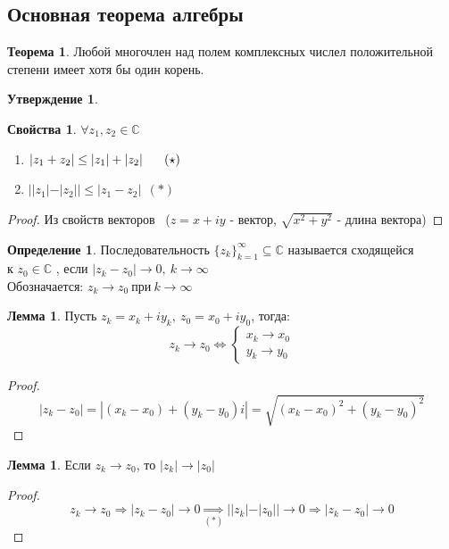 \documentclass[a4paper, 12pt]{article}
\newcommand\tab[1][.5cm]{\hspace*{#1}}
\newcounter{lemcount}
\newcounter{lemcount2}
\theoremstyle{definition}
\newtheorem*{definition}{Определение}
\newtheorem*{theorem}{Теорема}
\newtheorem*{subtheorem}{Утверждение}
\newtheorem*{properties}{Свойства}
\newtheorem{lemmanum}[lemcount]{Лемма}
\begin{document}
  \subsection{Основная теорема алгебры}
  \begin{theorem}
    Любой многочлен над полем комплексных числел положительной степени имеет хотя бы один корень.
  \end{theorem}
  \begin{subtheorem}\tab
    \begin{properties}\tab
      $\forall z_1, z_2 \in \mathbb{C}$
      \begin{enumerate} 
        \item $|z_1+z_2|\leq |z_1| + |z_2| \tab[0.61cm] (\star)$
        \item $||z_1|-|z_2||\leq |z_1-z_2| \ \ (*)$ 
      \end{enumerate}
      \begin{proof}
        Из свойств векторов \ ($z = x+iy$ - вектор, $\sqrt{x^2+y^2}$ - длина вектора)
      \end{proof} 
    \end{properties}
  \end{subtheorem}
  \begin{definition}
    Последовательность $\{z_k\}_{k=1}^{\infty} \subseteq \mathbb{C}$ называется сходящейся \\ к $z_0 \in \mathbb{C}$ , если $|z_k-z_0| \to 0, \ k\to \infty$\\
    Обозначается: $z_k \to z_0 \ \text{при} \ k\to \infty$ 
  \end{definition} 
  \setcounter{lemcount}{0}
  \begin{lemmanum}
    Пусть $z_k = x_k+iy_k, \ z_0 = x_0 + iy_0$, тогда:
    $$z_k \to z_0 \Longleftrightarrow \begin{cases}
      x_k \to x_0 \\
      y_k \to y_0
    \end{cases}$$  
  \end{lemmanum} 
  \begin{proof}
    $$|z_k-z_0|  = |(x_k - x_0) + (y_k - y_0)i| = \sqrt{(x_k - x_0)^2+(y_k - y_0)^2}$$ 
  \end{proof} 
  \begin{lemmanum}
    Если $z_k \to z_0$, то $|z_k| \to |z_0|$  
  \end{lemmanum} 
  \begin{proof}
    $$z_k \to z_0 \Longrightarrow |z_k - z_0| \to 0 \underset{(*)}{\Longrightarrow}  ||z_k|-|z_0|| \to 0 \Longrightarrow |z_k - z_0| \to 0$$ 
  \end{proof} 
\end{document}
